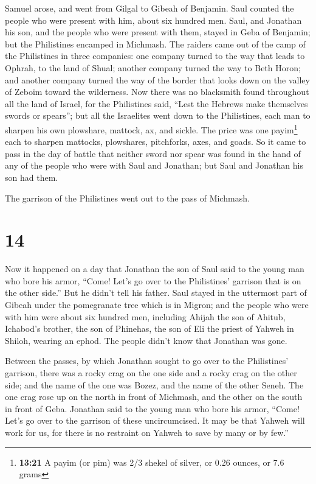  Samuel arose, and went from Gilgal to Gibeah of
Benjamin. Saul counted the people who were present with him, about six
hundred men.  Saul, and Jonathan his son, and the people
who were present with them, stayed in Geba of Benjamin; but the
Philistines encamped in Michmash.  The raiders came out
of the camp of the Philistines in three companies: one company turned to
the way that leads to Ophrah, to the land of Shual; 
another company turned the way to Beth Horon; and another company turned
the way of the border that looks down on the valley of Zeboim toward the
wilderness.  Now there was no blacksmith found throughout
all the land of Israel, for the Philistines said, ``Lest the Hebrews
make themselves swords or spears'';  but all the
Israelites went down to the Philistines, each man to sharpen his own
plowshare, mattock, ax, and sickle.  The price was one
payim\footnote{\textbf{13:21} A payim (or pim) was 2/3 shekel of silver,
  or 0.26 ounces, or 7.6 grams} each to sharpen mattocks, plowshares,
pitchforks, axes, and goads.  So it came to pass in the
day of battle that neither sword nor spear was found in the hand of any
of the people who were with Saul and Jonathan; but Saul and Jonathan his
son had them.

 The garrison of the Philistines went out to the pass of
Michmash.

\hypertarget{section-13}{%
\section{14}\label{section-13}}

 Now it happened on a day that Jonathan the son of Saul
said to the young man who bore his armor, ``Come! Let's go over to the
Philistines' garrison that is on the other side.'' But he didn't tell
his father.  Saul stayed in the uttermost part of Gibeah
under the pomegranate tree which is in Migron; and the people who were
with him were about six hundred men,  including Ahijah the
son of Ahitub, Ichabod's brother, the son of Phinehas, the son of Eli
the priest of Yahweh in Shiloh, wearing an ephod. The people didn't know
that Jonathan was gone.

 Between the passes, by which Jonathan sought to go over
to the Philistines' garrison, there was a rocky crag on the one side and
a rocky crag on the other side; and the name of the one was Bozez, and
the name of the other Seneh.  The one crag rose up on the
north in front of Michmash, and the other on the south in front of Geba.
 Jonathan said to the young man who bore his armor,
``Come! Let's go over to the garrison of these uncircumcised. It may be
that Yahweh will work for us, for there is no restraint on Yahweh to
save by many or by few.''

